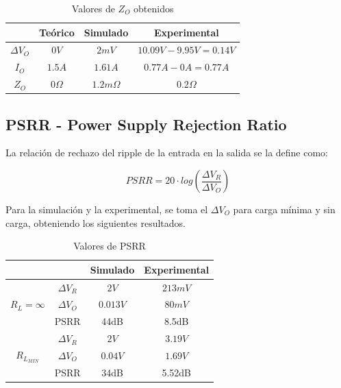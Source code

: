 \begin{table}[!ht]

\begin{center}
\begin{tabular}{|c||c|c|c|}
\hline
& Te\'orico & Simulado & Experimental\\
\hline 
$\Delta V_O$ & $0V$ & $2mV$ & $10.09V-9.95V=0.14V$\\
\hline 
$I_O$ &  $1.5A$    &   $1.61A$     & $0.77A - 0A = 0.77A$\\
\hline
$Z_O$ &   $0\Omega$   &    $1.2m\Omega$    & $0.2\Omega$\\
\hline
\end{tabular}
\end{center}

\caption{Valores de $Z_O$ obtenidos}
\end{table}


\subsection{PSRR - Power Supply Rejection Ratio}

La relaci\'on de rechazo del ripple de la entrada en la salida se la define como:

\[
PSRR = 20 \cdot log \left( \frac{\Delta V_R}{\Delta V_O} \right)
\]

Para la simulaci\'on y la experimental, se toma el $\Delta V_O$ para carga m\'inima y sin carga, obteniendo los siguientes resultados.

\begin{table}[!ht]
\centering
\begin{tabular}{|c|c|c|c|}
\hline
\multicolumn{2}{|c|}{}                         & Simulado & Experimental \\ \hline
\multirow{3}{*}{$R_L = \infty$} & $\Delta V_R$ &  $2V$    & $213mV$              \\ \cline{2-4} 
                                & $\Delta V_O$ &  $0.013V$& $80mV$             \\ \cline{2-4} 
                                & PSRR         &  44dB    & 8.5dB              \\ \hline
\multirow{3}{*}{$R_{L_{MIN}}$}  & $\Delta V_R$ &  $2V$    &  $3.19V$            \\ \cline{2-4} 
                                & $\Delta V_O$ &  $0.04V$ & $1.69V$              \\ \cline{2-4} 
                                & PSRR         &  34dB    &  5.52dB            \\ \hline
\end{tabular}
\caption{Valores de PSRR}

\end{table}

